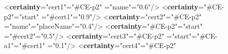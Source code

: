 \begin{shaded}
\mbox{}\newline 
{<\textbf{certainty}\hspace*{1em}{xml:id}="{cert1}"\hspace*{1em}{target}="{\#CE-p2}"\mbox{}\newline 
\hspace*{1em}{locus}="{name}"\hspace*{1em}{degree}="{0.6}"/>}\mbox{}\newline 
{<\textbf{certainty}\hspace*{1em}{target}="{\#CE-p2}"\hspace*{1em}{locus}="{start}"\mbox{}\newline 
\hspace*{1em}{given}="{\#cert1}"\hspace*{1em}{degree}="{0.9}"/>}\mbox{}\newline 
{<\textbf{certainty}\hspace*{1em}{xml:id}="{cert2}"\hspace*{1em}{target}="{\#CE-p2}"\mbox{}\newline 
\hspace*{1em}{locus}="{name}"\hspace*{1em}{assertedValue}="{placeName}"\hspace*{1em}{degree}="{0.4}"/>}\mbox{}\newline 
{<\textbf{certainty}\hspace*{1em}{target}="{\#CE-p2}"\hspace*{1em}{locus}="{start}"\mbox{}\newline 
\hspace*{1em}{given}="{\#cert2}"\hspace*{1em}{degree}="{0.5}"/>}\mbox{}\newline 
{<\textbf{certainty}\hspace*{1em}{xml:id}="{cert3}"\hspace*{1em}{target}="{\#CE-p2}"\mbox{}\newline 
\hspace*{1em}{locus}="{start}"\hspace*{1em}{assertedValue}="{\#CE-a1}"\hspace*{1em}{given}="{\#cert1}"\mbox{}\newline 
\hspace*{1em}{degree}="{0.1}"/>}\mbox{}\newline 
{<\textbf{certainty}\hspace*{1em}{xml:id}="{cert4}"\hspace*{1em}{target}="{\#CE-p2}"\mbox{}\newline 
}
\end{shaded}
